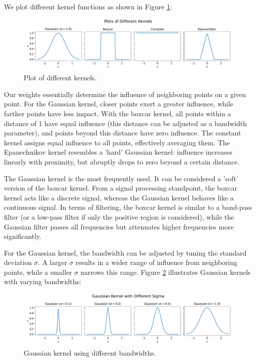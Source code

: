 \documentclass{article}
\begin{document}
We plot different kernel functions as shown in Figure \ref{fig:kernels}:

\begin{figure}[H]
    \centering
    \includegraphics[width=\textwidth]{results/kernels.pdf}
    \caption{Plot of different kernels.}
    \label{fig:kernels}
\end{figure}

Our weights essentially determine the influence of neighboring points on a given point. For the Gaussian kernel, closer points exert a greater influence, while farther points have less impact. With the boxcar kernel, all points within a distance of 1 have equal influence (this distance can be adjusted as a bandwidth parameter), and points beyond this distance have zero influence. The constant kernel assigns equal influence to all points, effectively averaging them. The Epanechnikov kernel resembles a 'hard' Gaussian kernel: influence increases linearly with proximity, but abruptly drops to zero beyond a certain distance.

The Gaussian kernel is the most frequently used. It can be considered a 'soft' version of the boxcar kernel. From a signal processing standpoint, the boxcar kernel acts like a discrete signal, whereas the Gaussian kernel behaves like a continuous signal. In terms of filtering, the boxcar kernel is similar to a band-pass filter (or a low-pass filter if only the positive region is considered), while the Gaussian filter passes all frequencies but attenuates higher frequencies more significantly.

For the Gaussian kernel, the bandwidth can be adjusted by tuning the standard deviation $\sigma$. A larger $\sigma$ results in a wider range of influence from neighboring points, while a smaller $\sigma$ narrows this range. Figure \ref{fig:gaussian_kernels} illustrates Gaussian kernels with varying bandwidths:

\begin{figure}[H]
    \centering
    \includegraphics[width=\textwidth]{results/gaussian_kernels.pdf}
    \caption{Gaussian kernel using different bandwidths.}
    \label{fig:gaussian_kernels}
\end{figure}
\end{document}
